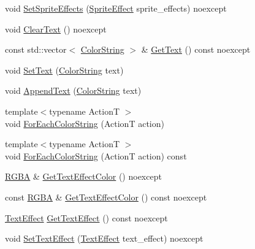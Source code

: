 \begin{DoxyCompactItemize}
\item 
void \hyperlink{classmage_1_1rendering_1_1_sprite_text_a0d2f1e88db1e1fec1b7c6b2563ef7271}{Set\+Sprite\+Effects} (\hyperlink{namespacemage_1_1rendering_a4dbc3536c87b906f1d41d863ec458e78}{Sprite\+Effect} sprite\+\_\+effects) noexcept
\item 
void \hyperlink{classmage_1_1rendering_1_1_sprite_text_a4458a9a429369d6cc0ed34eb93f3e632}{Clear\+Text} () noexcept
\item 
const std\+::vector$<$ \hyperlink{classmage_1_1rendering_1_1_color_string}{Color\+String} $>$ \& \hyperlink{classmage_1_1rendering_1_1_sprite_text_a3a07e4043ce7058cb157111738c664cb}{Get\+Text} () const noexcept
\item 
void \hyperlink{classmage_1_1rendering_1_1_sprite_text_a3e7bc7515af8cb92351b0bef475e7dbe}{Set\+Text} (\hyperlink{classmage_1_1rendering_1_1_color_string}{Color\+String} text)
\item 
void \hyperlink{classmage_1_1rendering_1_1_sprite_text_a3b61f48d6001d8a7adf44d946797399b}{Append\+Text} (\hyperlink{classmage_1_1rendering_1_1_color_string}{Color\+String} text)
\item 
{\footnotesize template$<$typename ActionT $>$ }\\void \hyperlink{classmage_1_1rendering_1_1_sprite_text_a133345323aefa564460fd5cebe62cf78}{For\+Each\+Color\+String} (ActionT action)
\item 
{\footnotesize template$<$typename ActionT $>$ }\\void \hyperlink{classmage_1_1rendering_1_1_sprite_text_af990e2c3ad1e827135b78a948c4cba50}{For\+Each\+Color\+String} (ActionT action) const
\item 
\hyperlink{structmage_1_1_r_g_b_a}{R\+G\+BA} \& \hyperlink{classmage_1_1rendering_1_1_sprite_text_aa5cd1f28efdf8508474dd962e8733783}{Get\+Text\+Effect\+Color} () noexcept
\item 
const \hyperlink{structmage_1_1_r_g_b_a}{R\+G\+BA} \& \hyperlink{classmage_1_1rendering_1_1_sprite_text_a7705f00b0172153d52f31f170b12968f}{Get\+Text\+Effect\+Color} () const noexcept
\item 
\hyperlink{classmage_1_1rendering_1_1_sprite_text_af07ecf28d2ab8997c011cab74e799ef7}{Text\+Effect} \hyperlink{classmage_1_1rendering_1_1_sprite_text_a7c61e9d50bb6c3c46507706e1aad8d5c}{Get\+Text\+Effect} () const noexcept
\item 
void \hyperlink{classmage_1_1rendering_1_1_sprite_text_a0870da91f8c11f63c09bf6de1bce4ce3}{Set\+Text\+Effect} (\hyperlink{classmage_1_1rendering_1_1_sprite_text_af07ecf28d2ab8997c011cab74e799ef7}{Text\+Effect} text\+\_\+effect) noexcept

\end{DoxyCompactItemize}
